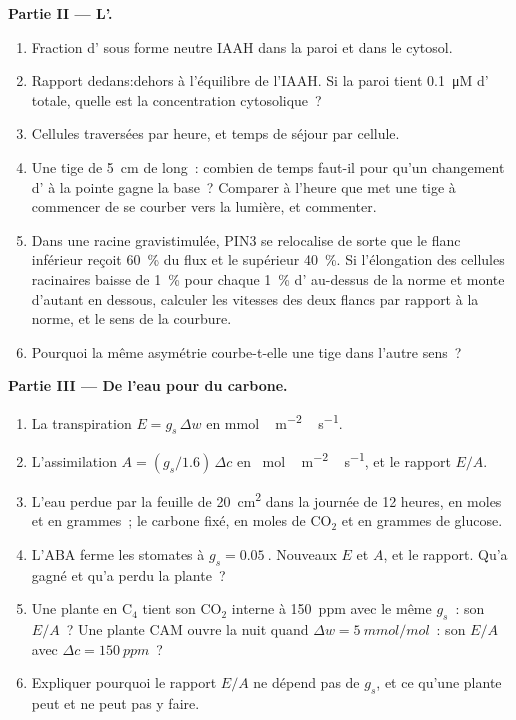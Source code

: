 \begin{problem}
\medskip
\noindent\textbf{Partie II --- L'.}
\begin{enumerate}[resume]
  \item Fraction d' sous forme neutre IAAH dans la paroi et dans
        le cytosol.
  \item Rapport dedans:dehors à l'équilibre de l'IAAH. Si la paroi tient
        \qty{0.1}{\micro M} d' totale, quelle est la concentration
        cytosolique~?
  \item Cellules traversées par heure, et temps de séjour par cellule.
  \item Une tige de \qty{5}{cm} de long~: combien de temps faut-il pour
        qu'un changement d' à la pointe gagne la base~? Comparer à
        l'heure que met une tige à commencer de se courber vers la
        lumière, et commenter.
  \item Dans une racine gravistimulée, PIN3 se relocalise de sorte que
        le flanc inférieur reçoit \qty{60}{\%} du flux et le supérieur
        \qty{40}{\%}. Si l'élongation des cellules racinaires baisse de
        \qty{1}{\%} pour chaque \qty{1}{\%} d' au-dessus de la
        norme et monte d'autant en dessous, calculer les vitesses des
        deux flancs par rapport à la norme, et le sens de la courbure.
  \item Pourquoi la même asymétrie courbe-t-elle une tige dans l'autre
        sens~?
\end{enumerate}

\medskip
\noindent\textbf{Partie III --- De l'eau pour du carbone.}
\begin{enumerate}[resume]
  \item La transpiration $E = g_{s}\,\Delta w$ en \unit{mmol\,m^{-2}\,s^{-1}}.
  \item L'assimilation $A = (g_{s}/1.6)\,\Delta c$ en \unit{\micro
        mol\,m^{-2}\,s^{-1}}, et le rapport $E/A$.
  \item L'eau perdue par la feuille de \qty{20}{cm^2} dans la journée de
        12 heures, en moles et en grammes~; le carbone fixé, en moles de
        CO$_{2}$ et en grammes de glucose.
  \item L'ABA ferme les stomates à $g_{s} = \qty{0.05}{}$. Nouveaux $E$
        et $A$, et le rapport. Qu'a gagné et qu'a perdu la plante~?
  \item Une plante en C$_{4}$ tient son CO$_{2}$ interne à
        \qty{150}{ppm} avec le même $g_{s}$~: son $E/A$~? Une plante CAM
        ouvre la nuit quand $\Delta w = \qty{5}{mmol/mol}$~: son $E/A$
        avec $\Delta c =
        \qty{150}{ppm}$~?
  \item Expliquer pourquoi le rapport $E/A$ ne dépend pas de $g_{s}$, et
        ce qu'une plante peut et ne peut pas y faire.
\end{enumerate}


\end{problem}
